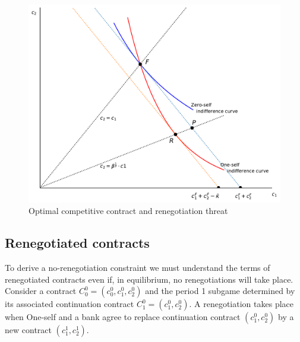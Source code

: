 \documentclass[11pt,english]{article}
\theoremstyle{plain}
\theoremstyle{definition}
\begin{document}
\begin{figure}[p]
  \includegraphics[scale=0.7]{Figure1.pdf}
  \caption{Optimal competitive contract and renegotiation threat}
  \label{fig:c1c2}
\end{figure}


\subsection{Renegotiated contracts}

To derive a no-renegotiation constraint we must understand the
terms of renegotiated contracts even if, in equilibrium, no renegotiations
will take place. Consider a contract $C_{0}^{0}=(c_{0}^{0},c_{1}^{0},c_{2}^{0})$
and the period 1 subgame determined by its associated continuation
contract $C_{1}^{0}=(c_{1}^{0},c_{2}^{0})$. A renegotiation takes
place when One-self and a bank agree to replace continuation contract
$(c_{1}^{0},c_{2}^{0})$ by a new contract $\left(c_{1}^{1},c_{2}^{1}\right)$.
\end{document}
